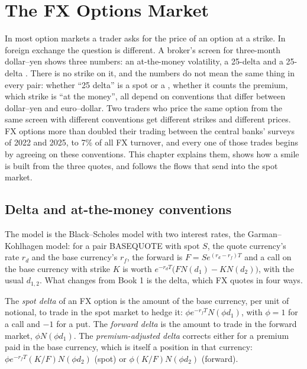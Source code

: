 \chapter{The FX Options Market}\label{ch:m2:the-fx-options-market}

In most option markets a trader asks for the price of an option at a strike.
In foreign exchange the question is different. A broker's screen for
three-month dollar--yen shows three numbers: an at-the-money volatility, a
25-delta  and a 25-delta . There is no strike on it, and
the numbers do not mean the same thing in every pair: whether ``25 delta'' is a
spot or a , whether it counts the premium, which strike is ``at
the money'', all depend on conventions that differ between dollar--yen and
euro--dollar. Two traders who price the same option from the same screen with
different conventions get different strikes and different prices. FX options
more than doubled their trading between the central banks' surveys of 2022 and
2025, to 7\% of all FX turnover, and every one of those trades begins by
agreeing on these conventions. This chapter explains them, shows how a smile is
built from the three quotes, and follows the flows that  send
into the spot market.

\section{Delta and at-the-money conventions}

The model is the Black--Scholes model with two interest rates, the
Garman--Kohlhagen model: for a pair BASEQUOTE with spot $S$, the quote
currency's rate $r_d$ and the base currency's $r_f$, the forward is
$F = S e^{(r_d - r_f)T}$ and a call on the base currency with strike $K$ is worth
$e^{-r_d T}\bigl(F N(d_1) - K N(d_2)\bigr)$, with the usual $d_{1,2}$. What changes
from Book 1 is the delta, which FX quotes in four ways.

\begin{definition}\label{def:m2:the-fx-options-market:delta}
The \emph{spot delta} of an FX option is the amount of the base
currency, per unit of notional, to trade in the spot market to hedge it:
$\phi e^{-r_f T} N(\phi d_1)$, with $\phi = 1$ for a call and $-1$ for a put. The
\emph{forward delta} is the amount to trade in the forward
market, $\phi N(\phi d_1)$. The \emph{premium-adjusted
delta} corrects either for a premium paid in the
base currency, which is itself a position in that currency:
$\phi e^{-r_f T} (K/F) N(\phi d_2)$ (spot) or $\phi (K/F) N(\phi d_2)$ (forward).
\end{definition}

